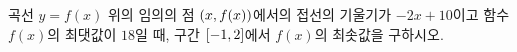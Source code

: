 곡선 $y=f(x)$ 위의 임의의 점 $(x{,}\mkern3mu\mathopen{}f(x))$에서의 접선의 기울기가 $-2x+10$이고 함수 $f(x)$의 최댓값이 $18$일 때, 구간 $[-1{,}\mkern3mu\mathopen{}2]$에서 $f(x)$의 최솟값을 구하시오.
